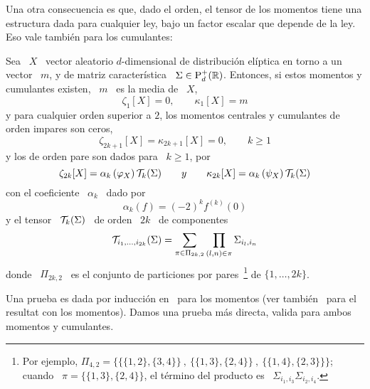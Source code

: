 Una otra consecuencia es que, dado el orden, el tensor de los momentos tiene una
estructura dada  para cualquier ley,  bajo un factor  escalar que depende  de la
ley.  Eso vale tambi\'en para los cumulantes:
%
\begin{teorema}
\label{Teo:MP:MomentosCumulantesEliptica}
%
  Sea \ $X$  \ vector aleatorio $d$-dimensional de  distribuci\'on el\'iptica en
  torno  a  un  vector  \  $m$,  y de  matriz  caracter\'istica  \  $\Sigma  \in
  \mathrm{P}_d^+(\mathbb{R})$.  Entonces, si  estos momentos y cumulantes existen,  \ $m$ \
  es la media de \ $X$, \ie
  \[
  \zeta_1[X] = 0, \qquad \kappa_1[X] = m
  \]
  y para cualquier orden superior a  $2$, los momentos centrales y cumulantes de
  orden impares son ceros,
  \[
  \zeta_{2 k + 1}[X] = \kappa_{2 k + 1}[X] = 0, \qquad k \ge 1
  \]
  y los de orden pare son dados para \ $k \ge 1$, por
  \[
  \zeta_{2 k}[X] = \alpha_k\left( \varphi_X \right) \mathcal{T}_k(\Sigma) \qquad y \qquad
  \kappa_{2 k}[X] = \alpha_k\left( \psi_X \right) \mathcal{T}_k(\Sigma)
  \]
  con el coeficiente \ $\alpha_k$ \ dado por
  \[
  \alpha_k(f) = (-2)^k f^{(k)}(0)
  \]
  y el tensor \ $\mathcal{T}_k(\Sigma)$ \ de orden \ $2 k$ \ de componentes
  \[
  \mathcal{T}_{i_1,\ldots,i_{2k}}(\Sigma) = \sum_{\pi \in \Pi_{2 k , 2}} \prod_{(l,n) \in
    \pi} \Sigma_{i_l,i_n}
  \]
  donde   \  $\Pi_{2   k  ,   2}$   \  es   el  conjunto   de  particiones   por
  pares~\footnote{Por  ejemplo, $\Pi_{4,2}  =  \Big\{ \big\{  \{1,2\} ,  \{3,4\}
    \big\} \:  , \: \big\{  \{1,3\} ,  \{2,4\} \big\} \:  , \: \big\{  \{1,4\} ,
    \{2,3\} \big\} \big\}$; cuando \ $\pi = \big\{ \{1,3\} , \{2,4\} \Big\}$, el
    t\'ermino del producto es \ $\Sigma_{i_1,i_3} \Sigma_{i_2,i_4}$.} de $\{ 1 ,
  \ldots , 2 k \}$.
\end{teorema}
%
Una prueba  es dada  por inducci\'on en~\cite{BerBen86}  para los  momentos (ver
tambi\'en~\cite[p.~44]{FanKot90} para el resultat  con los momentos).  Damos una
prueba m\'as directa, valida para ambos momentos y cumulantes.
%
